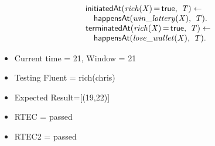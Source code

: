 \documentclass[8pt]{beamer}
\DeclareMathOperator{\val}{=}  %
\def \patsize {}
\def\happensAt{\textsf{\patsize happensAt}}
\def\initiatedAt{\textsf{\patsize initiatedAt}}
\def\terminatedAt{\textsf{\patsize terminatedAt}}
\def\true{\textsf{\patsize true}}
\newenvironment{mysplit}%
  {\arraycolsep 0pt \begin{array}{l}}%
  {\end{array}}
\begin{document}
\begin{frame}
\begin{minipage}{0.5\linewidth}
        \begin{align*}
            \begin{mysplit}
                \initiatedAt\mathit{(rich(X)\val\true,\ T) \leftarrow}\\
                \quad    \happensAt\mathit{(win\_lottery(X),\ T).}\\
                \terminatedAt\mathit{(rich(X)\val\true,\ T) \leftarrow}\\
                \quad    \happensAt\mathit{(lose\_wallet(X),\ T)}.\\
            \end{mysplit}
        \end{align*}
    \end{minipage}
    \begin{itemize}

        \item Current time = 21, Window = 21
        \item Testing Fluent = rich(chris)
        \item Expected Result=[(19,22)]
        \item RTEC = passed
        \item RTEC2 = passed
    \end{itemize}
\end{frame}
\end{document}
